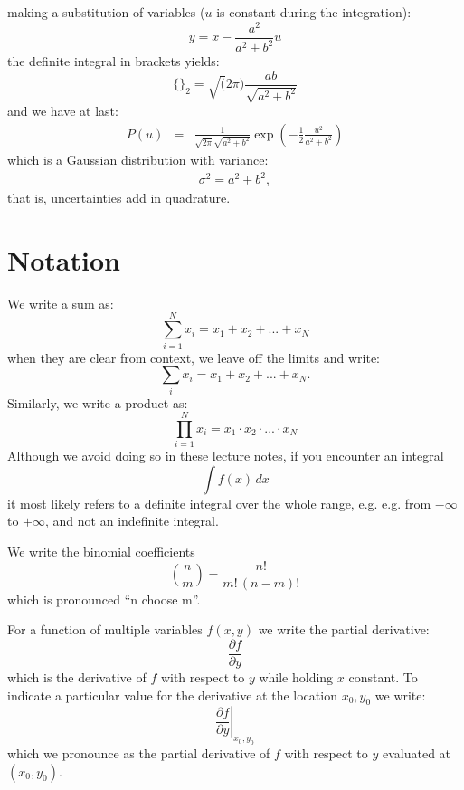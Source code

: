 \documentclass[12pt,oneside]{book}
\begin{document}
making a substitution of variables ($u$ is constant during the integration):
\begin{equation*}
y = x-\frac{a^2}{a^2+b^2}u
\end{equation*}
the definite integral in brackets yields:
\begin{equation}
\{\}_2 = \sqrt(2 \pi) \frac{a b}{\sqrt{a^2+b^2}}
\end{equation}
and we have at last:
\begin{eqnarray*}
P(u) &=& \frac{1}{\sqrt{2\pi} \sqrt{a^2+b^2}}  \exp \left( -\frac{1}{2} \frac{u^2}{a^2+b^2} \right)
\end{eqnarray*}
which is a Gaussian distribution with variance:
\begin{eqnarray*}
\sigma^2 = a^2 + b^2,
\end{eqnarray*}
that is, uncertainties add in quadrature.


\chapter{Notation}

We write a sum as:
\begin{displaymath}
\sum_{i=1}^{N} x_i = x_1 + x_2 + ... + x_N 
\end{displaymath}
when they are clear from context, we leave off the limits and write:
\begin{displaymath}
\sum_i x_i = x_1 + x_2 + ... + x_N .
\end{displaymath}
Similarly, we write a product as:
\begin{displaymath}
\prod_{i=1}^{N} x_i = x_1 \cdot x_2 \cdot ... \cdot x_N 
\end{displaymath}
Although we avoid doing so in these lecture notes, if you encounter an integral
\begin{displaymath}
\int f(x) \, dx
\end{displaymath}
it most likely refers to a definite integral over the whole range, e.g. 
e.g. from $-\infty$ to $+\infty$, and not an indefinite integral. 

We write the binomial coefficients
\begin{displaymath}
\binom{n}{m} = \frac{n!}{m! \, (n-m)!}
\end{displaymath}
which is pronounced ``n choose m''.

For a function of multiple variables $f(x,y)$ we write the partial derivative:
\begin{displaymath}
\frac{\partial f}{\partial y}
\end{displaymath}
which is the derivative of $f$ with respect to $y$ while holding $x$
constant.  To indicate a particular value for the derivative at
the location ${x_0, y_0}$ we write:
\begin{displaymath}
\left. \frac{\partial f}{\partial y} \right|_{x_0, y_0}
\end{displaymath}
which we pronounce as the partial derivative of $f$ with respect to $y$ evaluated at $(x_0, y_0)$.
\end{document}
